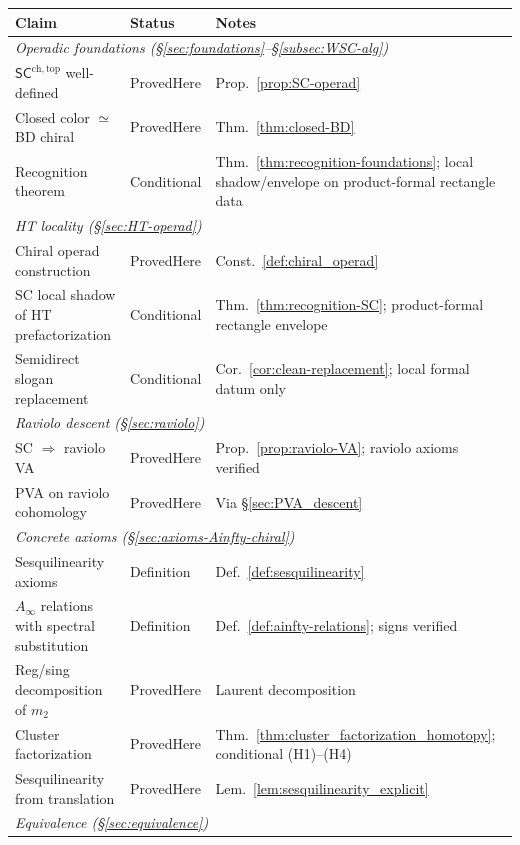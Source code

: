 \begin{center}
\renewcommand{\arraystretch}{1.3}
\begin{tabular}{p{}p{}p{}}
\textbf{Claim} & \textbf{Status} & \textbf{Notes} \\
\hline
\multicolumn{3}{l}{\emph{Operadic foundations (\S\ref{sec:foundations}--\S\ref{subsec:WSC-alg})}} \\
$\mathsf{SC}^{\mathrm{ch,top}}$ well-defined & ProvedHere & Prop.~\ref{prop:SC-operad} \\
Closed color $\simeq$ BD chiral & ProvedHere & Thm.~\ref{thm:closed-BD} \\
Recognition theorem & Conditional & Thm.~\ref{thm:recognition-foundations}; local shadow/envelope on product-formal rectangle data \\
\hline
\multicolumn{3}{l}{\emph{HT locality (\S\ref{sec:HT-operad})}} \\
Chiral operad construction & ProvedHere & Const.~\ref{def:chiral_operad} \\
SC local shadow of HT prefactorization & Conditional & Thm.~\ref{thm:recognition-SC}; product-formal rectangle envelope \\
Semidirect slogan replacement & Conditional & Cor.~\ref{cor:clean-replacement}; local formal datum only \\
\hline
\multicolumn{3}{l}{\emph{Raviolo descent (\S\ref{sec:raviolo})}} \\
SC $\Rightarrow$ raviolo VA & ProvedHere & Prop.~\ref{prop:raviolo-VA}; raviolo axioms verified \\
PVA on raviolo cohomology & ProvedHere & Via \S\ref{sec:PVA_descent} \\
\hline
\multicolumn{3}{l}{\emph{Concrete axioms (\S\ref{sec:axioms-Ainfty-chiral})}} \\
Sesquilinearity axioms & Definition & Def.~\ref{def:sesquilinearity} \\
$A_\infty$ relations with spectral substitution & Definition & Def.~\ref{def:ainfty-relations}; signs verified \\
Reg/sing decomposition of $m_2$ & ProvedHere & Laurent decomposition \\
Cluster factorization & ProvedHere & Thm.~\ref{thm:cluster_factorization_homotopy}; conditional (H1)--(H4) \\
Sesquilinearity from translation & ProvedHere & Lem.~\ref{lem:sesquilinearity_explicit} \\
\hline
\multicolumn{3}{l}{\emph{Equivalence (\S\ref{sec:equivalence})}} \\

\end{tabular}
\end{center}
